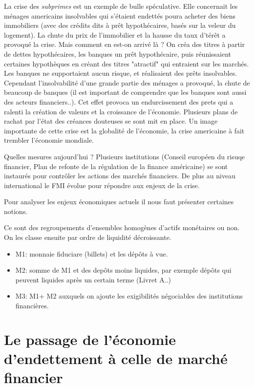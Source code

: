La crise des \emph{subprimes} est un exemple de bulle spéculative. Elle concernait les ménages americains insolvables qui s'étaient endettés poura acheter des
biens immobiliers (avec des crédits dits à prêt hypothécaires, basés sur la veleur du logement). La chute du prix de l'immobilier et la hausse du taux d'térêt a 
provoqué la crise. Mais comment en est-on arrivé là ? On créa des titres à partir de dettes hypothécaires, les banques un prêt hypothécaire, puis réunissaient 
certaines hypothèques en créant des titres "atractif" qui entraient sur les marchés. Les banques ne supportaient aucun risque, et réalisaient des prêts 
insolvables. Cependant l'insolvabilité d'une grande partie des ménages a provoqué, la chute de beaucoup de banques (il est important de comprendre que les 
banques sont aussi des acteurs financiers..). Cet effet provoca un endurcissement des prets qui a ralenti la création de valeurs et la croissance de 
l'économie. Plusieurs plans de rachat par l'état des créances douteuses se sont mit en place. Un image importante de cette crise est la globalité de 
l'économie, la crise americaine à fait trembler l'économie mondiale. 

Quelles mesures aujourd'hui ? Plusieurs institutions (Conseil européen du risuqe financier, Plan de refonte de la régulation de la finance américaine) se sont
 instaurés pour contrôler les actions des marchés financiers. De plus au niveau international le FMI évolue pour répondre aux enjeux de la crise. 
 
Pour analyser les enjeux économiques actuels il nous faut présenter certaines notions.

\begin{tcolorbox}[title=Les agrégats monétaires]
	Ce sont des regroupements d'ensembles homogènes d'actifs monétaires ou non. On les classe ensuite par ordre de liquidité décroissante. 
	\begin{itemize}[label=]
		\item M1: monnaie fiduciare (billets) et les dépôts à vue.
		\item M2: somme de M1 et des depôts moins liquides, par exemple dépôts qui peuvent liquides après un certain terme (Livret A..)
		\item M3: M1+ M2 auxquels on ajoute les exigibilités négociables des institutions financières.
	\end{itemize}
	
\end{tcolorbox}

\section{Le passage de l'économie d'endettement à celle de marché financier} %
\label{sec:le_passage_de_l_economie_d_endettement_a_celle_de_marche_financier}

